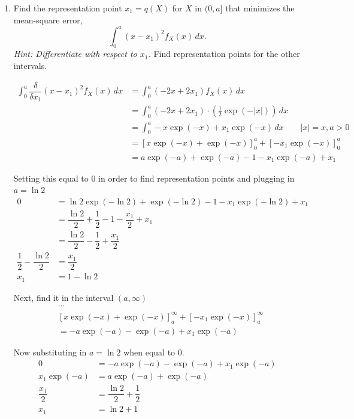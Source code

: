 \documentclass[11pt]{article}
\begin{document}
\begin{enumerate}[label=(\alph*)]
    \item Find the representation point $x_1 = q(X)$ for $X$ in $(0,a]$ that minimizes the mean-square error,
    \[
        \int_0^a (x - x_1)^2 f_X(x)\, dx.
    \]
    \textit{Hint: Differentiate with respect to $x_1$.} Find representation points for the other intervals.

    \begin{solution}

        \begin{align*}
            \int_0^a \dfrac{\delta}{\delta x_1}(x - x_1)^2 f_X(x)\, dx &= \int_0^a (-2x + 2x_1) f_X(x)\, dx \\
            &= \int_0^a (-2x + 2x_1) \cdot (\frac{1}{2} \exp(-|x|))\, dx \\
            &= \int_0^a -x \exp(-x) + x_1 \exp(-x)\, dx \qquad \text{$|x| = x, a > 0$} \\
            &= \left[ x \exp(-x) + \exp(-x) \right]_{0}^{a} + \left[ - x_1 \exp(-x) \right]_{0}^{a} \\
            &= a \exp(-a) + \exp(-a) - 1 - x_1 \exp(-a) + x_1
        \end{align*}

        Setting this equal to $0$ in order to find representation points and plugging in $a = \ln{2}$
        \begin{align*}
            0 &= \ln{2} \exp(-\ln{2}) + \exp(-\ln{2}) - 1 - x_1 \exp(-\ln{2}) + x_1 \\
            &= \dfrac{\ln{2}}{2} + \dfrac{1}{2} - 1 - \dfrac{x_1}{2} + x_1 \\
            &= \dfrac{\ln{2}}{2} - \dfrac{1}{2} + \dfrac{x_1}{2} \\
            \dfrac{1}{2} - \dfrac{\ln{2}}{2} &= \dfrac{x_1}{2} \\
            x_1 &= 1 - \ln{2}
        \end{align*}

        Next, find it in the interval $(a, \infty)$
        \begin{align*}
            &\cdots \\
            &\left[ x \exp(-x) + \exp(-x) \right]_{a}^{\infty} + \left[ - x_1 \exp(-x) \right]_{a}^{\infty} \\
            &= - a\exp(-a) - \exp(-a) + x_1 \exp(-a)
        \end{align*}

        Now substituting in $a = \ln{2}$ when equal to $0$.
        \begin{align*}
            0 &= - a\exp(-a) - \exp(-a) + x_1 \exp(-a) \\
            x_1 \exp(-a) &= a\exp(-a) + \exp(-a) \\
            \dfrac{x_1}{2} &= \dfrac{\ln{2}}{2} + \dfrac{1}{2} \\
            x_1 &= \ln{2} + 1
        \end{align*}


\end{solution}
\end{enumerate}
\end{document}
